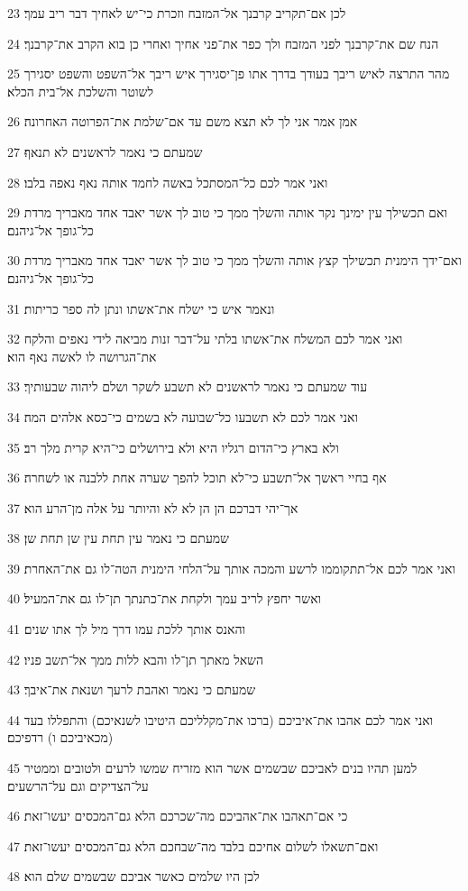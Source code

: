 \par 23 לכן אם־תקריב קרבנך אל־המזבח וזכרת כי־יש לאחיך דבר ריב עמך׃
\par 24 הנח שם את־קרבנך לפני המזבח ולך כפר את־פני אחיך ואחרי כן בוא הקרב את־קרבנך׃
\par 25 מהר התרצה לאיש ריבך בעודך בדרך אתו פן־יסגירך איש ריבך אל־השפט והשפט יסגירך לשוטר והשלכת אל־בית הכלא׃
\par 26 אמן אמר אני לך לא תצא משם עד אם־שלמת את־הפרוטה האחרונה׃
\par 27 שמעתם כי נאמר לראשנים לא תנאף׃
\par 28 ואני אמר לכם כל־המסתכל באשה לחמד אותה נאף נאפה בלבו׃
\par 29 ואם תכשילך עין ימינך נקר אותה והשלך ממך כי טוב לך אשר יאבד אחד מאבריך מרדת כל־גופך אל־גיהנם׃
\par 30 ואם־ידך הימנית תכשילך קצץ אותה והשלך ממך כי טוב לך אשר יאבד אחד מאבריך מרדת כל־גופך אל־גיהנם׃
\par 31 ונאמר איש כי ישלח את־אשתו ונתן לה ספר כריתות׃
\par 32 ואני אמר לכם המשלח את־אשתו בלתי על־דבר זנות מביאה לידי נאפים והלקח את־הגרושה לו לאשה נאף הוא׃
\par 33 עוד שמעתם כי נאמר לראשנים לא תשבע לשקר ושלם ליהוה שבעותיך׃
\par 34 ואני אמר לכם לא תשבעו כל־שבועה לא בשמים כי־כסא אלהים המה׃
\par 35 ולא בארץ כי־הדום רגליו היא ולא בירושלים כי־היא קרית מלך רב׃
\par 36 אף בחיי ראשך אל־תשבע כי־לא תוכל להפך שערה אחת ללבנה או לשחרה׃
\par 37 אך־יהי דברכם הן הן לא לא והיותר על אלה מן־הרע הוא׃
\par 38 שמעתם כי נאמר עין תחת עין שן תחת שן׃
\par 39 ואני אמר לכם אל־תתקוממו לרשע והמכה אותך על־הלחי הימנית הטה־לו גם את־האחרת׃
\par 40 ואשר יחפץ לריב עמך ולקחת את־כתנתך תן־לו גם את־המעיל׃
\par 41 והאנס אותך ללכת עמו דרך מיל לך אתו שנים׃
\par 42 השאל מאתך תן־לו והבא ללות ממך אל־תשב פניו׃
\par 43 שמעתם כי נאמר ואהבת לרעך ושנאת את־איבך׃
\par 44 ואני אמר לכם אהבו את־איביכם (ברכו את־מקלליכם היטיבו לשנאיכם) והתפללו בעד (מכאיביכם ו) רדפיכם׃
\par 45 למען תהיו בנים לאביכם שבשמים אשר הוא מזריח שמשו לרעים ולטובים וממטיר על־הצדיקים וגם על־הרשעים׃
\par 46 כי אם־תאהבו את־אהביכם מה־שכרכם הלא גם־המכסים יעשו־זאת׃
\par 47 ואם־תשאלו לשלום אחיכם בלבד מה־שבחכם הלא גם־המכסים יעשו־זאת׃
\par 48 לכן היו שלמים כאשר אביכם שבשמים שלם הוא׃

